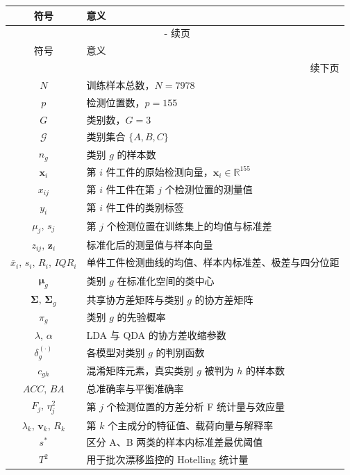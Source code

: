 \documentclass[12pt,a4paper]{article}
\renewcommand{\thetable}{\arabic{section}-\arabic{table}}
\begin{document}
\begin{longtable}{cl}
    \toprule
    符号 & 意义 \\
    \midrule
    \endfirsthead
    \multicolumn{2}{c}{{\tablename\ \thetable{} 续页}} \\
    \toprule
    符号 & 意义 \\
    \midrule
    \endhead
    \midrule
    \multicolumn{2}{r}{{续下页}} \\
    \endfoot
    \bottomrule
    \endlastfoot
    $N$ & 训练样本总数，$N=7978$ \\
    $p$ & 检测位置数，$p=155$ \\
    $G$ & 类别数，$G=3$ \\
    $\mathcal{G}$ & 类别集合 $\{A,B,C\}$ \\
    $n_g$ & 类别 $g$ 的样本数 \\
    $\mathbf{x}_i$ & 第 $i$ 件工件的原始检测向量，$\mathbf{x}_i\in\mathbb{R}^{155}$ \\
    $x_{ij}$ & 第 $i$ 件工件在第 $j$ 个检测位置的测量值 \\
    $y_i$ & 第 $i$ 件工件的类别标签 \\
    $\mu_j,\,s_j$ & 第 $j$ 个检测位置在训练集上的均值与标准差 \\
    $z_{ij},\,\mathbf{z}_i$ & 标准化后的测量值与样本向量 \\
    $\bar{x}_i,\,s_i,\,R_i,\,IQR_i$ & 单件工件检测曲线的均值、样本内标准差、极差与四分位距 \\
    $\boldsymbol{\mu}_g$ & 类别 $g$ 在标准化空间的类中心 \\
    $\boldsymbol{\Sigma},\,\boldsymbol{\Sigma}_g$ & 共享协方差矩阵与类别 $g$ 的协方差矩阵 \\
    $\pi_g$ & 类别 $g$ 的先验概率 \\
    $\lambda,\,\alpha$ & LDA 与 QDA 的协方差收缩参数 \\
    $\delta_g^{(\cdot)}$ & 各模型对类别 $g$ 的判别函数 \\
    $c_{gh}$ & 混淆矩阵元素，真实类别 $g$ 被判为 $h$ 的样本数 \\
    $ACC,\,BA$ & 总准确率与平衡准确率 \\
    $F_j,\,\eta_j^2$ & 第 $j$ 个检测位置的方差分析 F 统计量与效应量 \\
    $\lambda_k,\,\mathbf{v}_k,\,R_k$ & 第 $k$ 个主成分的特征值、载荷向量与解释率 \\
    $s^{*}$ & 区分 A、B 两类的样本内标准差最优阈值 \\
    $T^2$ & 用于批次漂移监控的 Hotelling 统计量 \\
\end{longtable}
\end{document}
